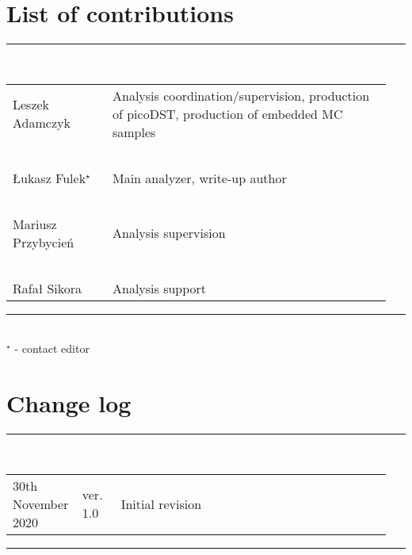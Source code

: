 \section*{\LARGE List of contributions}%
%
   \rule{\textwidth}{1.0pt}\\[5pt]%
      \begin{tabular}{>{\raggedright}p{0.25\linewidth}p{0.7\linewidth}}
		Leszek Adamczyk & Analysis coordination/supervision, production of picoDST, production of embedded MC samples\\
		~&~\\
		Łukasz Fulek$^{\star}$  & Main analyzer, write-up author\\
		~&~\\
		Mariusz Przybycień & Analysis supervision\\
		~&~\\
        Rafał Sikora & Analysis support\\
      \end{tabular}\newline
   \rule{\textwidth}{1.0pt}\\[10pt]%
   $^{\star}$ - contact editor
   \\[50pt]%
\section*{\LARGE Change log}%
%
  \rule{\textwidth}{1.0pt}\\[5pt]%
  \begin{tabular}{>{\raggedright}p{0.15\linewidth}p{0.1\linewidth}p{0.7\linewidth}}
  	 30th November 2020 & ver. 1.0 & Initial revision
  \end{tabular}\newline%
 \rule{\textwidth}{1.0pt}